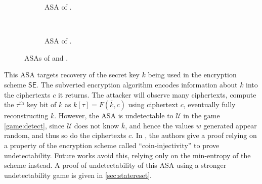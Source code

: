 \begin{figure}
\centering
\begin{subfigure}[t]{0.5\textwidth}
\centering
{}
\caption{ASA of \cite{C:BelPatRog14}.}
\label{figure:bprsubv}
\end{subfigure}~~\vrule~~~
\begin{subfigure}[t]{0.5\textwidth}
\centering
{}
\caption{ASA of \cite{CCS:BelJaeKan15}.}
\label{figure:bjksubv}
\end{subfigure}
\caption[ASAs of \cite{C:BelPatRog14} and \cite{CCS:BelJaeKan15}]{ASAs of \cite{C:BelPatRog14} and \cite{CCS:BelJaeKan15}.}
\label{figure:bprandbjk}
\end{figure}

This ASA targets recovery of the secret key $k$ being used in the encryption scheme $\mathsf{SE}$. The subverted encryption algorithm encodes information about $k$ into the ciphertexts $c$ it returns. The attacker will observe many ciphertexts, compute the $\tau^\text{th}$ key bit of $k$ as $k[\tau]=F(\overline{k}, c)$ using ciphertext $c$, eventually fully reconstructing $k$. However, the ASA is undetectable to $\mathcal{U}$ in the game \autoref{game:detect}, since $\mathcal{U}$ does not know $\overline{k}$, and hence the values $w$ generated appear random, and thus so do the ciphertexts $c$. In \cite{C:BelPatRog14}, the authors give a proof relying on a property of the encryption scheme called ``coin-injectivity'' to prove undetectability. Future works avoid this, relying only on the min-entropy of the scheme instead. A proof of undetectability of this ASA using a stronger undetectability game is given in \autoref{sec:statereset}.

